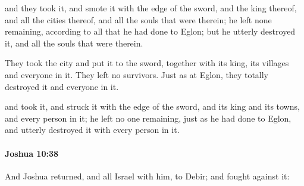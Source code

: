 			\begin{versebox}
					\item[BHS] 
					\item[ASV] and they took it, and smote it with the edge of the sword, and the king thereof, and all the cities thereof, and all the souls that were therein; he left none remaining, according to all that he had done to Eglon; but he utterly destroyed it, and all the souls that were therein.
					\item[NIV] They took the city and put it to the sword, together with its king, its villages and everyone in it. They left no survivors. Just as at Eglon, they totally destroyed it and everyone in it.
					\item[NRSV] and took it, and struck it with the edge of the sword, and its king and its towns, and every person in it; he left no one remaining, just as he had done to Eglon, and utterly destroyed it with every person in it.
			\end{versebox}

		\paragraph{Joshua 10:38} %
			\label{JOSHUA-10-38}

			And Joshua returned, and all Israel with him, to Debir; and fought against it:

